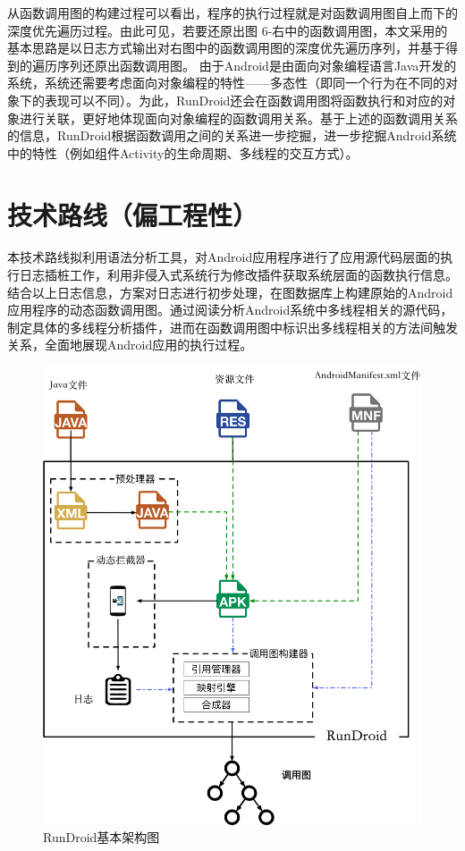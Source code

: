 从函数调用图的构建过程可以看出，程序的执行过程就是对函数调用图自上而下的深度优先遍历过程。由此可见，若要还原出图 6-右中的函数调用图，本文采用的基本思路是以日志方式输出对右图中的函数调用图的深度优先遍历序列，并基于得到的遍历序列还原出函数调用图。
由于Android是由面向对象编程语言Java开发的系统，系统还需要考虑面向对象编程的特性——多态性（即同一个行为在不同的对象下的表现可以不同）。为此，RunDroid还会在函数调用图将函数执行和对应的对象进行关联，更好地体现面向对象编程的函数调用关系。基于上述的函数调用关系的信息，RunDroid根据函数调用之间的关系进一步挖掘，进一步挖掘Android系统中的特性（例如组件Activity的生命周期、多线程的交互方式）。

\section{技术路线（偏工程性）}
本技术路线拟利用语法分析工具，对Android应用程序进行了应用源代码层面的执行日志插桩工作，利用非侵入式系统行为修改插件获取系统层面的函数执行信息。结合以上日志信息，方案对日志进行初步处理，在图数据库上构建原始的Android应用程序的动态函数调用图。通过阅读分析Android系统中多线程相关的源代码，制定具体的多线程分析插件，进而在函数调用图中标识出多线程相关的方法间触发关系，全面地展现Android应用的执行过程。
 
 
\begin{figure}[h]
\centering
\includegraphics[height=0.5\textheight]{./Figures/rundroid-overview.png}
\caption{ RunDroid基本架构图}
\label{fig:rundroid_overview}
\end{figure}


